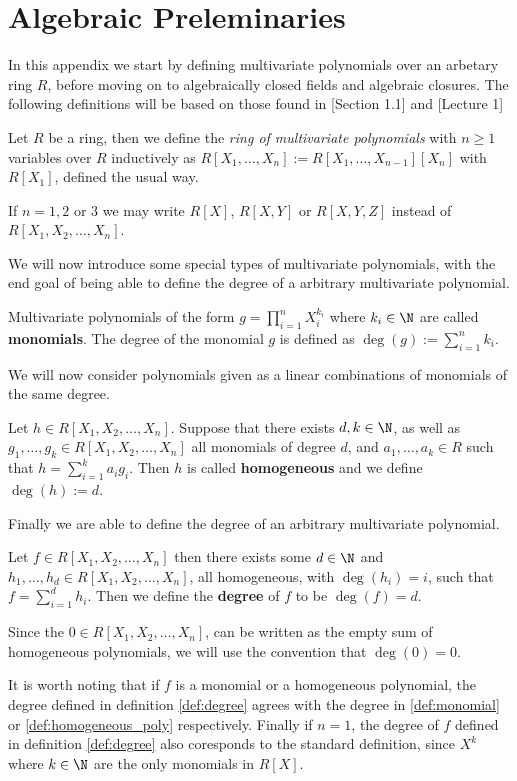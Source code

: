 \chapter{Algebraic Preleminaries}
In this appendix we start by defining multivariate polynomials over an arbetary ring $R$, before moving on to algebraically closed fields and algebraic closures.
The following definitions will be based on those found in \cite{Fulton}[Section 1.1] and \cite{alg_geom_lec}[Lecture 1]
\begin{definition}
  Let $R$ be a ring, then we define the \textit{ring of multivariate polynomials} with $n \geq 1$ variables over $R$ inductively as $R[X_{1}, \ldots, X_{n}] := R[X_{1}, \ldots, X_{n - 1}][X_{n}]$ with $R[X_{1}]$, defined the usual way.
\end{definition}
\begin{remark}
If $n = 1, 2$ or $3$ we may write $R[X]$, $R[X, Y]$ or $R[X, Y, Z]$ instead of $R[X_1, X_2, \ldots, X_{n}]$.
\end{remark}
We will now introduce some special types of multivariate polynomials, with the end goal of being able to define the degree of a arbitrary multivariate polynomial.
\begin{definition}\label{def:monomial}
  Multivariate polynomials of the form $g = \prod_{i = 1}^{n} X_{i}^{k_{i}}$ where $k_{i} \in \N$ are called \textbf{monomials}. The degree of the monomial $g$ is defined  as $\deg(g) := \sum^{n}_{i = 1} k_{i}$.
\end{definition}
We will now consider polynomials given as a linear combinations of monomials of the same degree.
\begin{definition}\label{def:homogeneous_poly}
  Let $h \in R[X_1, X_2, \ldots, X_{n}]$. Suppose that there exists $d, k \in \N$, as well as $g_1, \ldots, g_{k} \in R[X_1, X_2, \ldots, X_{n}]$ all monomials of degree $d$, and $a_{1}, \ldots, a_{k} \in R$ such that $h = \sum^{k}_{i = 1} a_{i} g_{i}$. Then $h$ is called \textbf{homogeneous} and we define $\deg(h) := d$.
\end{definition}
Finally we are able to define the degree of an arbitrary multivariate polynomial.
\begin{definition}\label{def:degree}
  Let $f \in R[X_1, X_2, \ldots, X_{n}]$ then there exists some $d \in \N$ and $h_{1}, \ldots, h_{d} \in R[X_1, X_2, \ldots, X_{n}]$, all homogeneous, with $\deg(h_{i}) = i$, such that $f = \sum^{d}_{i = 1} h_{i}$.
  Then we define the \textbf{degree} of $f$ to be $\deg(f) = d$.
\end{definition}
\begin{remark}\label{rem:deg_0}
  Since the $0 \in R[X_1, X_2, \ldots, X_{n}]$, can be written as the empty sum of homogeneous polynomials, we will use the convention that $\deg(0) = 0$.
\end{remark}
It is worth noting that if $f$ is a monomial or a homogeneous polynomial, the degree defined in definition \ref{def:degree} agrees with the degree in \ref{def:monomial} or \ref{def:homogeneous_poly} respectively.
Finally if $n = 1$, the degree of $f$ defined in definition \ref{def:degree} also coresponds to the standard definition, since $X^{k}$ where $k \in \N$ are the only monomials in $R[X]$.

